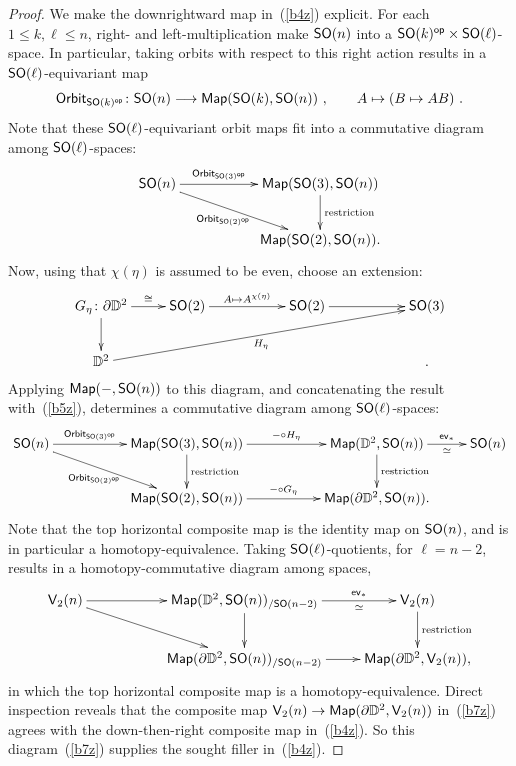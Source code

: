 \begin{proof}
We make the downrightward map in~(\ref{b4z}) explicit.
For each $1\leq k , \ell \leq n$, 
right- and left-multiplication make ${\sf SO}(n)$ into a ${\sf SO}(k)^{\operatorname{\mathsf{op}}}\times {\sf SO}(\ell)$-space.
In particular, taking orbits with respect to this right action results in a ${\sf SO}(\ell)$-equivariant map
\[
{\sf Orbit}_{{\sf SO}(k)^{\operatorname{\mathsf{op}}}}
\colon
{\sf SO}(n)
\longrightarrow
\operatorname{{\sf Map}}( {\sf SO}(k) , {\sf SO}(n) )
~,\qquad
A
\mapsto
(B
\mapsto 
AB
)
~.
\]
Note that these ${\sf SO}(\ell)$-equivariant orbit maps fit into a commutative diagram among ${\sf SO}(\ell)$-spaces:
\begin{equation}
\label{b5z}
\xymatrix{
{\sf SO}(n)
\ar[rr]^-{{\sf Orbit}_{{\sf SO}(3)^{\op}}}
\ar[drr]_-{{\sf Orbit}_{{\sf SO}(2)^{\op}}}
&&
\Map( {\sf SO}(3) , {\sf SO}(n) )
\ar[d]^-{\rm restriction}
\\
&&
\Map( {\sf SO}(2) , {\sf SO}(n) )
.
}
\end{equation}
Now, using that $\chi(\eta)$ is assumed to be even, choose an extension:
\[
\xymatrix{
G_{\eta}
\colon
\partial \DD^2
\ar[d]
\ar[r]^-{\cong}
&
{\sf SO}(2)
\ar[rr]^-{A\mapsto A^{\chi(\eta)}}
&&
{\sf SO}(2)
\ar[rr]
&&
{\sf SO}(3)
\\
\DD^2
\ar[urrrrr]_-{H_\eta}
&
&&
&&
.
}
\]
Applying $\operatorname{{\sf Map}}(-,{\sf SO}(n))$ to this diagram, and concatenating the result with~(\ref{b5z}), determines a commutative diagram among ${\sf SO}(\ell)$-spaces:
\begin{equation}
\label{b6z}
\xymatrix{
{\sf SO}(n)
\ar[rr]^-{{\sf Orbit}_{{\sf SO}(3)^{\op}}}
\ar[drr]_-{{\sf Orbit}_{{\sf SO}(2)^{\op}}}
&&
\Map( {\sf SO}(3) , {\sf SO}(n) )
\ar[d]^-{\rm restriction}
\ar[rr]^-{- \circ H_\eta}
&&
\Map(\DD^2 , {\sf SO}(n) )
\ar[d]^-{\rm restriction}
\ar[r]^-{\ev_\ast}_-{\simeq}
&
{\sf SO}(n)
\\
&&
\Map( {\sf SO}(2) , {\sf SO}(n) )
\ar[rr]^-{-\circ G_\eta}
&&
\Map( \partial \DD^2 , {\sf SO}(n) )
.
}
\end{equation}
Note that the top horizontal composite map is the identity map on ${\sf SO}(n)$, and is in particular a homotopy-equivalence.
Taking ${\sf SO}(\ell)$-quotients, for $\ell = n-2$, results in a homotopy-commutative diagram among spaces,
\begin{equation}
\label{b7z}
\xymatrix{
\sV_2(n)
\ar[rr]
\ar[drr]
&&
\Map(\DD^2 , {\sf SO}(n) )_{/{\sf SO}(n-2)}
\ar[d]
\ar[r]^-{\ev_\ast}_-{\simeq}
&
\sV_2(n)
\ar[d]^-{\rm restriction}
\\
&&
\Map( \partial \DD^2 , {\sf SO}(n) )_{/{\sf SO}(n-2)}
\ar[r]
&
\Map( \partial \DD^2 , \sV_2(n) )
,
}
\end{equation}
in which the top horizontal composite map is a homotopy-equivalence.  
Direct inspection reveals that the composite map $\mathsf V_2(n) \to \operatorname{{\sf Map}}( \partial \mathbb D^2 , \mathsf V_2(n) )$ in~(\ref{b7z}) agrees with the
down-then-right composite map in~(\ref{b4z}).
So this diagram~(\ref{b7z}) supplies the sought filler in~(\ref{b4z}).  







\end{proof}
